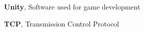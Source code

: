 \noindent
\textbf{Unity}, Software used for game development

\noindent
\textbf{TCP}, Transmission Control Protocol